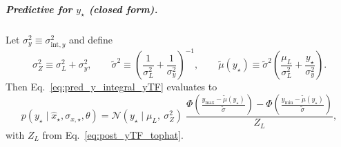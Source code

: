 \subparagraph{Predictive for $y_\star$ (closed form).}
Let $\sigma_y^2 \equiv \sigma_{\mathrm{int},y}^2$ and define
\begin{equation}
\sigma_Z^2 \equiv \sigma_L^2+\sigma_y^2,
\qquad
\tilde\sigma^2 \equiv \left(\frac{1}{\sigma_L^2}+\frac{1}{\sigma_y^2}\right)^{-1},
\qquad
\tilde\mu(y_\star) \equiv \tilde\sigma^2\left(\frac{\mu_L}{\sigma_L^2}+\frac{y_\star}{\sigma_y^2}\right).
\label{eq:tophat_aux}
\end{equation}
Then Eq.~\eqref{eq:pred_y_integral_yTF} evaluates to
\begin{equation}
p\!\left(y_\star \mid \hat x_\star,\sigma_{x,\star},\theta\right)
=
\mathcal N\!\left(y_\star \mid \mu_L,\ \sigma_Z^2\right)\;
\frac{
\Phi\!\left(\frac{y_{\max}-\tilde\mu(y_\star)}{\tilde\sigma}\right)
-
\Phi\!\left(\frac{y_{\min}-\tilde\mu(y_\star)}{\tilde\sigma}\right)
}{
Z_L
},
\label{eq:pred_y_tophat}
\end{equation}
with $Z_L$ from Eq.~\eqref{eq:post_yTF_tophat}.